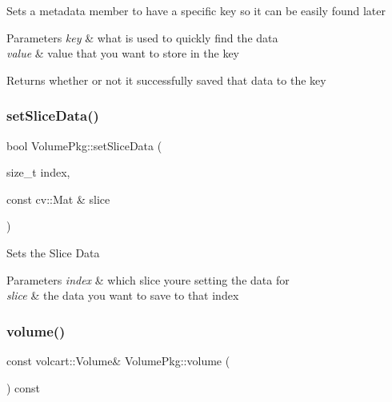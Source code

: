 Sets a metadata member to have a specific key so it can be easily found later 
\begin{DoxyParams}{Parameters}
{\em key} & what is used to quickly find the data \\
\hline
{\em value} & value that you want to store in the key \\
\hline
\end{DoxyParams}
\begin{DoxyReturn}{Returns}
whether or not it successfully saved that data to the key 
\end{DoxyReturn}
\hypertarget{classVolumePkg_a8d062ac46538de627f67f56ab35d6943}{}\label{classVolumePkg_a8d062ac46538de627f67f56ab35d6943} 
\subsubsection{\texorpdfstring{set\+Slice\+Data()}{setSliceData()}}
{\footnotesize\ttfamily bool Volume\+Pkg\+::set\+Slice\+Data (\begin{DoxyParamCaption}\item[{size\+\_\+t}]{index,  }\item[{const cv\+::\+Mat \&}]{slice }\end{DoxyParamCaption})}

Sets the Slice Data 
\begin{DoxyParams}{Parameters}
{\em index} & which slice you\textquotesingle{}re setting the data for \\
\hline
{\em slice} & the data you want to save to that index \\
\hline
\end{DoxyParams}
\hypertarget{classVolumePkg_af346c954f18704b60f4b518412d5b0b0}{}\label{classVolumePkg_af346c954f18704b60f4b518412d5b0b0} 
\subsubsection{\texorpdfstring{volume()}{volume()}\hspace{0.1cm}{\footnotesize\ttfamily [1/2]}}
{\footnotesize\ttfamily const volcart\+::\+Volume\& Volume\+Pkg\+::volume (\begin{DoxyParamCaption}{ }\end{DoxyParamCaption}) const\hspace{0.3cm}{\ttfamily [inline]}}

